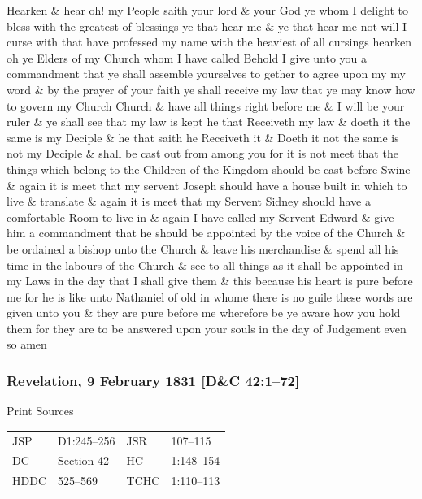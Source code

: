 				Hearken \& hear oh! my People saith your lord \& your God ye whom I delight to bless with the greatest of blessings ye that hear me \& ye that hear me not will I curse with that have professed my name with the heaviest of all cursings hearken oh ye Elders of my Church whom I have called Behold I give unto you a commandment that ye shall assemble yourselves to gether to agree upon my my word \& by the prayer of your faith ye shall receive my law that ye may know how to govern my \sout{Church} Church \& have all things right before me \& I will be your ruler \& ye shall see that my law is kept he that Receiveth my law \& doeth it the same is my Deciple \& he that saith he Receiveth it \& Doeth it not the same is not my Deciple \& shall be cast out from among you for it is not meet that the things which belong to the Children of the Kingdom should be cast before Swine \& again it is meet that my servent Joseph should have a house built in which to live \& translate \& again it is meet that my Servent Sidney should have a comfortable Room to live in \& again I have called my Servent Edward \& give him a commandment that he should be appointed by the voice of the Church \& be ordained a bishop unto the Church \& leave his merchandise \& spend all his time in the labours of the Church \& see to all things as it shall be appointed in my Laws in the day that I shall give them \& this because his heart is pure before me for he is like unto Nathaniel of old in whome there is no guile these words are given unto you \& they are pure before me wherefore be ye aware how you hold them for they are to be answered upon your souls in the day of Judgement even so amen
				
		\subsubsection{Revelation, 9 February 1831 [D\&C 42:1--72]}
			\label{EMS-1831-JS-9-FEB-1831}
		
			\begin{description}
				\item[Print Sources]
			\end{description}

				\begin{tabular}{p{0.5in}p{1in}p{0.5in}p{1in}}
				JSP	 	& D1:245--256	& JSR 		& 107--115 \\
				DC	 	& Section 42 	& HC 		& 1:148--154 \\
				HDDC 	& 525--569		& TCHC 		& 1:110--113 \\
				\end{tabular}
			
